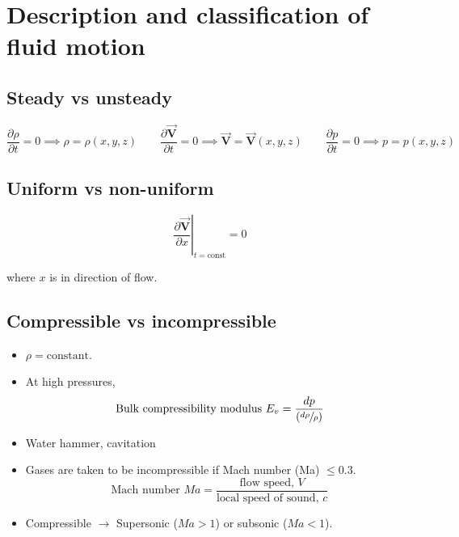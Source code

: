 \documentclass[12pt]{report}
\theoremstyle{remark}
\let\oldvec = \vec
\renewcommand{\vec}[1]{\oldvec{\mathbf{#1}}}
\begin{document}
\section{Description and classification of fluid motion}%
\label{sec:Description and classification of fluid motion}

\subsection{Steady vs unsteady}%
\label{sub:Steady vs unsteady}

\begin{equation*}
    \frac{\partial \rho}{\partial t} = 0 \implies \rho = \rho(x, y, z) \qquad
    \frac{\partial \vec{V}}{\partial t} = 0 \implies \vec{V} = \vec{V}(x, y, z) \qquad
    \frac{\partial p}{\partial t} = 0 \implies p = p(x, y, z)
\end{equation*}

\subsection{Uniform vs non-uniform}%
\label{sub:Uniform vs non-uniform}

\begin{equation*}
    \left.\frac{\partial \vec{V}}{\partial x} \right\rvert_{t = \text{const}} = 0
\end{equation*}

where $ x $ is in direction of flow. 

\subsection{Compressible vs incompressible}%
\label{sub:Compressible vs incompressible}

\begin{itemize}
    \item $ \rho = \text{constant} $.
    \item At high pressures, \[ \text{Bulk compressibility modulus } E_{v} = \frac{dp}{\left(\sfrac{d \rho}{\rho}\right)} \]
    \item Water hammer, cavitation
    \item Gases are taken to be incompressible if Mach number (Ma) $ \leq 0.3 $. \[ \text{Mach number } Ma = \frac{\text{flow speed, }V}{\text{local speed of sound, }c} \]
    \item Compressible $ \rightarrow $ Supersonic ($ Ma > 1 $) or subsonic ($ Ma < 1 $).
\end{itemize}
\end{document}
